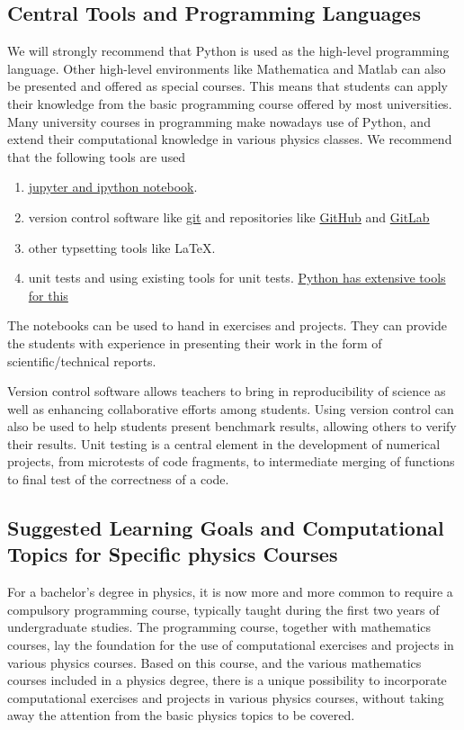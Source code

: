 \documentclass[graybox,envcountchap,sectrefs]{svmult}
\begin{document}
\subsection{Central Tools and Programming Languages}
We will strongly recommend that Python is used as the high-level
 programming language. Other high-level environments like Mathematica
 and Matlab can also be presented and offered as special courses. This
 means that students can apply their knowledge from the basic programming course offered by most universities.
Many university courses in programming  make nowadays use of Python, and extend their computational knowledge in
 various physics classes. We recommend  that the following
 tools are used
\begin{enumerate}
\item \href{{http://jupyter.org/}}{jupyter and ipython notebook}.

\item version control software like \href{{https://git-scm.com/}}{git} and repositories like \href{{https://github.com/}}{GitHub} and \href{{https://gitlab.com/}}{GitLab}

\item other typsetting tools like {\LaTeX}.

\item unit tests and using existing tools for unit tests. \href{{https://docs.python.org/2/library/unittest.html}}{Python has extensive tools for this}
\end{enumerate}


The notebooks can be used to hand in exercises and projects. They can
provide the students with experience in presenting their work in the
form of scientific/technical reports.

Version control software allows teachers to bring in reproducibility
of science as well as enhancing collaborative efforts among
students. Using version control can also be used to help students
present benchmark results, allowing others to verify their
results. Unit testing is a central element in the development of
numerical projects, from microtests of code fragments, to intermediate
merging of functions to final test of the correctness of a code.

\subsection{Suggested Learning Goals and Computational Topics for Specific physics Courses}
For a bachelor's degree in physics, it is now more and more common to require a compulsory
programming course, typically taught during the first two years of
undergraduate studies. The programming course, together with
mathematics courses, lay the foundation for the use of computational
exercises and projects in various physics courses. Based on this
course, and the various mathematics courses included in a physics
degree, there is a unique possibility to incorporate computational
exercises and projects in various physics courses, without taking away
the attention from the basic physics topics to be covered.
\end{document}
